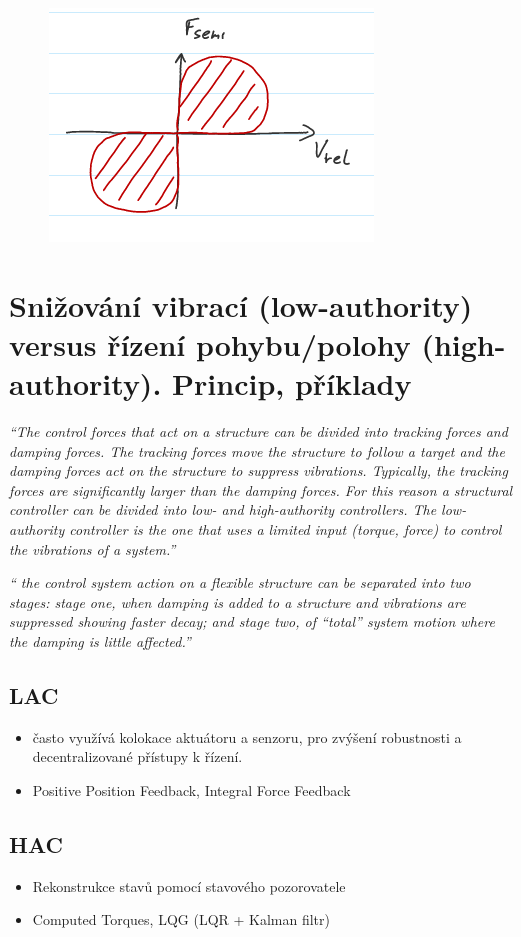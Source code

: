 \documentclass{article}
\begin{document}
	\begin{figure}[h!]
		\centering
		\includegraphics[width=0.4\linewidth]{figs/PoloAktivniAktuator.png}
	\end{figure}

	\section{Snižování vibrací (low-authority) versus řízení pohybu/polohy (high-authority). Princip, příklady}
	
	\emph{``The control forces that act on a structure can be divided into tracking forces and damping forces. The tracking forces move the structure to follow a target and the damping forces act on the structure to suppress vibrations. Typically, the tracking forces are significantly larger than the damping forces. For this reason a structural controller can be divided into low- and high-authority controllers. The low-authority controller is the one that uses a limited input (torque, force) to control the vibrations of a system.''}

	\emph{`` the control system action on a flexible structure can be separated into two stages: stage one, when damping is added to a structure and vibrations are suppressed showing faster decay; and stage two, of “total” system motion where the damping is little affected.''}
	
	\subsection*{LAC}
	\begin{itemize}
		\item často využívá kolokace aktuátoru a senzoru, pro zvýšení robustnosti a decentralizované přístupy k řízení.
		\item Positive Position Feedback, Integral Force Feedback
	\end{itemize}

	\subsection*{HAC}
	\begin{itemize}
		\item Rekonstrukce stavů pomocí stavového pozorovatele
		\item Computed Torques, LQG (LQR + Kalman filtr)
	\end{itemize}
\end{document}

